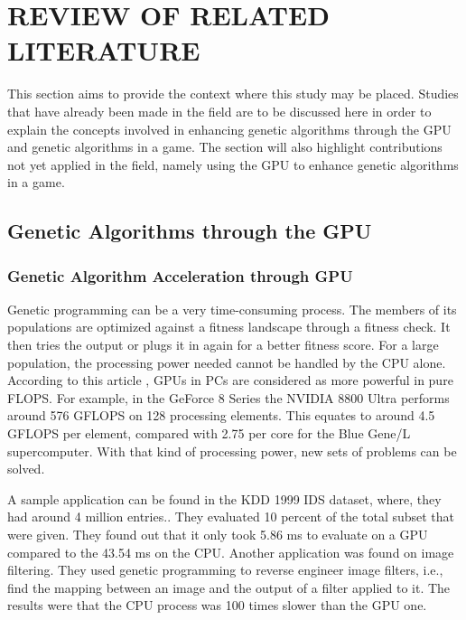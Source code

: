 \chapter{REVIEW OF RELATED LITERATURE}

This section aims to provide the context where this study may be placed. 
Studies that have already been made in the field are to be discussed here in order to 
explain the concepts involved in enhancing genetic algorithms through the GPU and 
genetic algorithms in a game. The section will also highlight contributions not yet 
applied in the field, namely using the GPU to enhance genetic algorithms in a game.


\section{Genetic Algorithms through the GPU}
\subsection{Genetic Algorithm Acceleration through GPU}
Genetic programming can be a very time-consuming process.  The members of its
populations are optimized against a fitness landscape through a fitness check. It
then tries the output or plugs it in again for a better fitness score. For a large
population, the processing power needed cannot be handled by the CPU alone. According
to this article , GPUs in PCs are considered as more powerful in pure FLOPS\cite{Banzhaf09}.
For example, in the GeForce 8 Series the NVIDIA 8800 Ultra performs around 576 GFLOPS
on 128 processing elements. This equates to around 4.5 GFLOPS per element, compared
with 2.75 per core for the Blue Gene/L supercomputer.  With that kind of processing power, 
new sets of problems can be solved.  

A sample application can be found in the KDD 1999 IDS dataset, where, they had around
4 million entries.\cite{Banzhaf09}. They evaluated 10 percent of the total subset that
were given. They found out that it only took 5.86 ms to evaluate on a GPU compared to
the 43.54 ms on the CPU. Another application was found on image filtering. They used
genetic programming to reverse engineer image filters, i.e., find the mapping between
an image and the output of a filter applied to it.  The results were that the CPU process 
was 100 times slower than the GPU one.  

